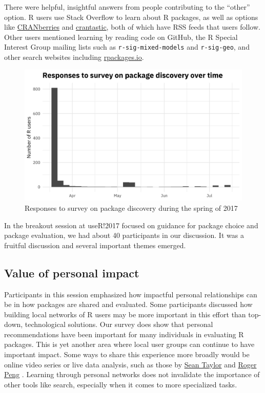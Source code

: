 There were helpful, insightful answers from people contributing to the
``other'' option. R users use Stack Overflow to learn about R packages,
as well as options like
\href{http://dirk.eddelbuettel.com/cranberries/}{CRANberries}
\citep{cranberries} and \href{http://www.crantastic.org/}{crantastic},
both of which have RSS feeds that users follow. Other users mentioned
learning by reading code on GitHub, the R Special Interest Group mailing
lists \citep{mailinglists} such as \texttt{r-sig-mixed-models} and
\texttt{r-sig-geo}, and other search websites including
\href{http://rpackages.io/}{rpackages.io}.

\begin{figure}
  \centering
  \includegraphics[scale=0.2]{survey_time-1}
  \caption{Responses to survey on package discovery during the spring of 2017}
  \label{figure:survey_time}
\end{figure}

In the breakout session at useR!2017 focused on guidance for package
choice and package evaluation, we had about 40 participants in our
discussion. It was a fruitful discussion and several important themes
emerged.

\hypertarget{value-of-personal-impact}{%
\subsection{Value of personal impact}\label{value-of-personal-impact}}

Participants in this session emphasized how impactful personal
relationships can be in how packages are shared and evaluated. Some
participants discussed how building local networks of R users may be
more important in this effort than top-down, technological solutions.
Our survey does show that personal recommendations have been important
for many individuals in evaluating R packages. This is yet another area
where local user groups can continue to have important impact. Some ways
to share this experience more broadly would be online video series or
live data analysis, such as those by
\href{https://www.facebook.com/seanjtaylor/videos/10103088186201897/}{Sean
Taylor} \citep{taylor} and \href{https://youtu.be/jWePleDwmQo}{Roger
Peng} \citep{peng}. Learning through personal networks does not
invalidate the importance of other tools like search, especially when it
comes to more specialized tasks.

